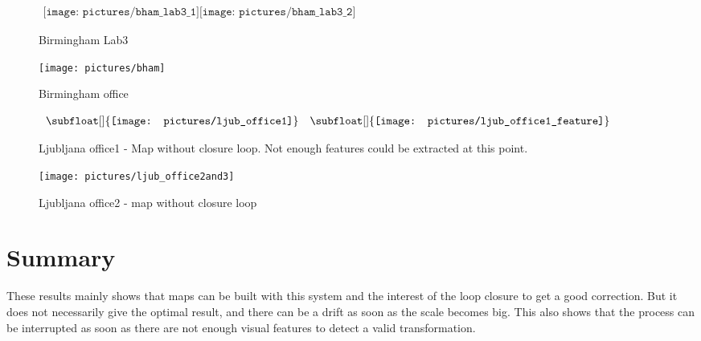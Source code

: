\begin{figure}[H]
\centering$
 \begin{array}{c}
 \texttt{[image: pictures/bham\_lab3\_1]}
 \texttt{[image: pictures/bham\_lab3\_2]}
 \end{array}$
\caption{Birmingham Lab3}
\end{figure}


\begin{figure}[H]
\centering
\texttt{[image: pictures/bham]}
\caption{Birmingham office}
\end{figure}

\begin{figure}[H]
\centering$
 \begin{array}{cc}
 \subfloat[]{\label{fig:ljub1_1} \texttt{[image: pictures/ljub\_office1]}} &
 \subfloat[]{\label{fig:ljub1_2} \texttt{[image: pictures/ljub\_office1\_feature]}}
 \end{array}$
\caption{Ljubljana office1 - \protect{} Map without closure loop. \protect{} Not enough features could be extracted at this point.}
\end{figure}


\begin{figure}[H]
\centering
\texttt{[image: pictures/ljub\_office2and3]}
\caption{Ljubljana office2 - map without closure loop}
\end{figure}

\section{Summary}

These results mainly shows that maps can be built with this system and the interest of the loop closure to get a good correction. But it does not necessarily  give the optimal result, and there can be a drift as soon as the scale becomes big. This also shows that the process can be interrupted as soon as there are not enough visual features to detect a valid transformation.

%
%



